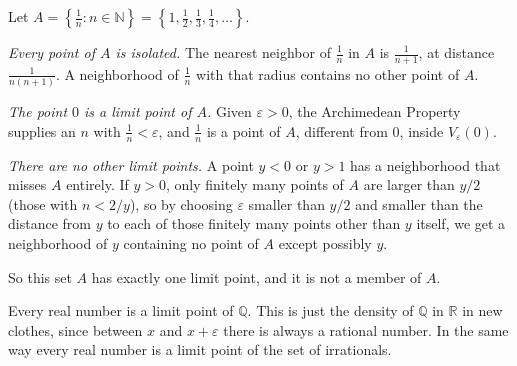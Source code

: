 \begin{example}
Let $A = \left\{\frac{1}{n} : n \in \mathbb{N}\right\} = \left\{1, \frac12, \frac13, \frac14, \ldots\right\}$.

\emph{Every point of $A$ is isolated.}  The nearest neighbor of $\frac1n$ in $A$ is $\frac{1}{n+1}$, at distance $\frac{1}{n(n+1)}$.  A neighborhood of $\frac1n$ with that radius contains no other point of $A$.

\emph{The point $0$ is a limit point of $A$.}  Given $\varepsilon > 0$, the Archimedean Property supplies an $n$ with $\frac1n < \varepsilon$, and $\frac1n$ is a point of $A$, different from $0$, inside $V_{\varepsilon}(0)$.

\emph{There are no other limit points.}  A point $y < 0$ or $y > 1$ has a neighborhood that misses $A$ entirely.  If $y > 0$, only finitely many points of $A$ are larger than $y/2$ (those with $n < 2/y$), so by choosing $\varepsilon$ smaller than $y/2$ and smaller than the distance from $y$ to each of those finitely many points other than $y$ itself, we get a neighborhood of $y$ containing no point of $A$ except possibly $y$.

So this set $A$ has exactly one limit point, and it is not a member of $A$.
\end{example}

\begin{marginfigure}
\centering
{}
\caption{The set $\left\{\frac1n\right\}$.  Each of its points stands alone, yet every neighborhood of $0$ catches infinitely many of them.}
\end{marginfigure}

\begin{example}
Every real number is a limit point of $\mathbb{Q}$.  This is just the density of $\mathbb{Q}$ in $\mathbb{R}$ in new clothes, since between $x$ and $x + \varepsilon$ there is always a rational number.  In the same way every real number is a limit point of the set of irrationals.
\end{example}

